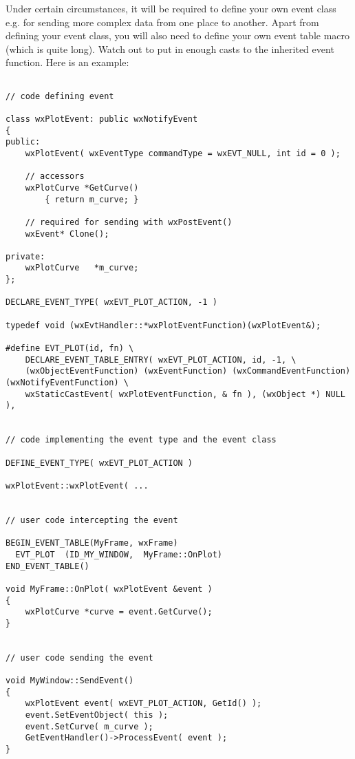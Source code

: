 
Under certain circumstances, it will be required to define your own event
class e.g. for sending more complex data from one place to another. Apart
from defining your event class, you will also need to define your own
event table macro (which is quite long). Watch out to put in enough
casts to the inherited event function. Here is an example:

{\small%
\begin{verbatim}

// code defining event

class wxPlotEvent: public wxNotifyEvent
{
public:
    wxPlotEvent( wxEventType commandType = wxEVT_NULL, int id = 0 );

    // accessors
    wxPlotCurve *GetCurve()
        { return m_curve; }

    // required for sending with wxPostEvent()
    wxEvent* Clone();

private:
    wxPlotCurve   *m_curve;
};

DECLARE_EVENT_TYPE( wxEVT_PLOT_ACTION, -1 )

typedef void (wxEvtHandler::*wxPlotEventFunction)(wxPlotEvent&);

#define EVT_PLOT(id, fn) \
    DECLARE_EVENT_TABLE_ENTRY( wxEVT_PLOT_ACTION, id, -1, \
    (wxObjectEventFunction) (wxEventFunction) (wxCommandEventFunction) (wxNotifyEventFunction) \
    wxStaticCastEvent( wxPlotEventFunction, & fn ), (wxObject *) NULL ),


// code implementing the event type and the event class

DEFINE_EVENT_TYPE( wxEVT_PLOT_ACTION )

wxPlotEvent::wxPlotEvent( ...


// user code intercepting the event

BEGIN_EVENT_TABLE(MyFrame, wxFrame)
  EVT_PLOT  (ID_MY_WINDOW,  MyFrame::OnPlot)
END_EVENT_TABLE()

void MyFrame::OnPlot( wxPlotEvent &event )
{
    wxPlotCurve *curve = event.GetCurve();
}


// user code sending the event

void MyWindow::SendEvent()
{
    wxPlotEvent event( wxEVT_PLOT_ACTION, GetId() );
    event.SetEventObject( this );
    event.SetCurve( m_curve );
    GetEventHandler()->ProcessEvent( event );
}

\end{verbatim}
}%

